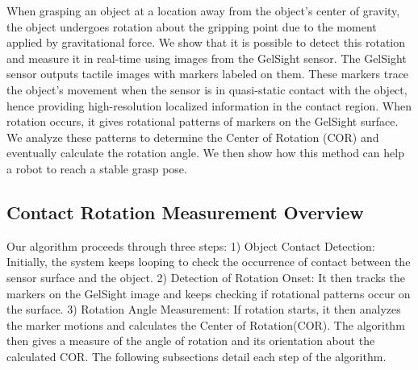 
When grasping an object at a location away from the object's center of gravity, the object undergoes rotation about the gripping point due to the moment applied by gravitational force. We show that it is possible to detect this rotation and measure it in real-time using images from the GelSight sensor. The GelSight sensor outputs tactile images with markers labeled on them. These markers trace the object's movement when the sensor is in quasi-static contact with the object, hence providing high-resolution localized information in the contact region. When rotation occurs, it gives rotational patterns of markers on the GelSight surface. We analyze these patterns to determine the Center of Rotation (COR) and eventually calculate the rotation angle. We then show how this method can help a robot to reach a stable grasp pose.

\subsection{Contact Rotation Measurement Overview}

Our algorithm proceeds through three steps: 1) Object Contact Detection: Initially, the system keeps looping to check the occurrence of contact between the sensor surface and the object. 2) Detection of Rotation Onset: It then tracks the markers on the GelSight image and keeps checking if rotational patterns occur on the surface. 3) Rotation Angle Measurement: If rotation starts, it then analyzes the marker motions and calculates the Center of Rotation(COR). The algorithm then gives a measure of the angle of rotation and its orientation about the calculated COR. The following subsections detail each step of the algorithm. 

